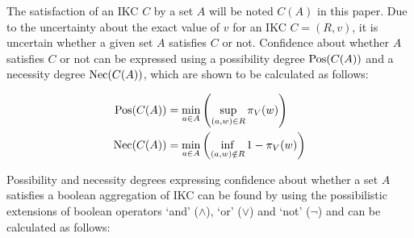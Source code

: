 The satisfaction of an IKC $C$ by a set $A$ will be noted $C(A)$ in this paper. Due to the uncertainty about the exact value of $v$ for an IKC $C = (R,v)$, it is uncertain whether a given set $A$ satisfies $C$ or not. Confidence about whether $A$ satisfies $C$ or not can be expressed using a possibility degree $\operatorname{Pos}(C(A))$ and a necessity degree $\operatorname{Nec}(C(A))$, which are shown to be calculated as follows:


\begin{align}
\operatorname{Pos}(C(A)) & = \min_{a \in A}\left(\sup_{(a,w) \in R}\pi_{V}(w)\right) \label{ill-known-pos}\\
\operatorname{Nec}(C(A)) & = \min_{a \in A}\left(\inf_{(a,w) \notin R} 1-\pi_{V}(w)\right) \label{ill-known-nec}
\end{align}

 


Possibility and necessity degrees expressing confidence about whether a set $A$ satisfies a boolean aggregation of IKC can be found by using the possibilistic extensions of boolean operators `and' ($\wedge$), `or' ($\vee$) and `not' ($\neg$) and can be calculated as follows:

